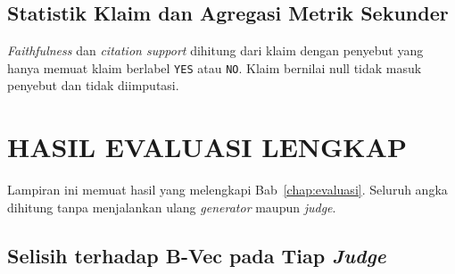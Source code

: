





\section{Statistik Klaim dan Agregasi Metrik Sekunder}
\label{subsec:lamp-a5}

\emph{Faithfulness} dan \emph{citation support} dihitung dari klaim dengan penyebut yang hanya memuat klaim berlabel \texttt{YES} atau \texttt{NO}. Klaim bernilai null tidak masuk penyebut dan tidak diimputasi.







\cleardoublepage
\chapter{HASIL EVALUASI LENGKAP}
\label{lamp:hasil-lengkap}

Lampiran ini memuat hasil yang melengkapi Bab~\ref{chap:evaluasi}. Seluruh angka dihitung tanpa menjalankan ulang \emph{generator} maupun \emph{judge}.

\section{Selisih terhadap B-Vec pada Tiap \emph{Judge}}
\label{sec:lamp-b-judge}

